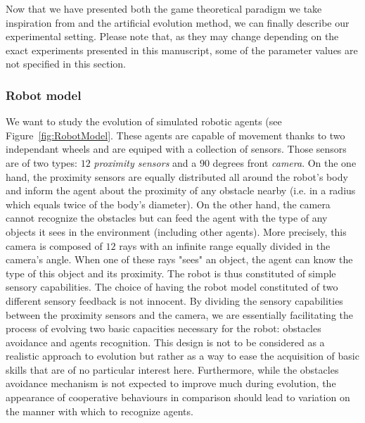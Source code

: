     Now that we have presented both the game theoretical paradigm we take inspiration from and the artificial evolution method, we can finally describe our experimental setting. Please note that, as they may change depending on the exact experiments presented in this manuscript, some of the parameter values are not specified in this section.

    \subsubsection{Robot model} We want to study the evolution of simulated robotic agents (see Figure~\ref{fig:RobotModel}. These agents are capable of movement thanks to two independant wheels and are equiped with a collection of sensors. Those sensors are of two types: $12$ \emph{proximity sensors} and a $90$ degrees front \emph{camera}. On the one hand, the proximity sensors are equally distributed all around the robot's body and inform the agent about the proximity of any obstacle nearby (i.e. in a radius which equals twice of the body's diameter). On the other hand, the camera cannot recognize the obstacles but can feed the agent with the type of any objects it sees in the environment (including other agents). More precisely, this camera is composed of $12$ rays with an infinite range equally divided in the camera's angle. When one of these rays "sees" an object, the agent can know the type of this object and its proximity. The robot is thus constituted of simple sensory capabilities. The choice of having the robot model constituted of two different sensory feedback is not innocent. By dividing the sensory capabilities between the proximity sensors and the camera, we are essentially facilitating the process of evolving two basic capacities necessary for the robot: obstacles avoidance and agents recognition. This design is not to be considered as a realistic approach to evolution but rather as a way to ease the acquisition of basic skills that are of no particular interest here. Furthermore, while the obstacles avoidance mechanism is not expected to improve much during evolution, the appearance of cooperative behaviours in comparison should lead to variation on the manner with which to recognize agents.

